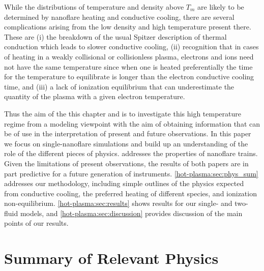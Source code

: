 While the distributions of temperature and density above $T_m$ are likely to be determined by nanoflare heating and conductive cooling, there are several complications arising from the low density and high temperature present there. These are (i) the breakdown of the usual Spitzer description of thermal conduction which leads to slower conductive cooling, (ii) recognition that in cases of heating in a weakly collisional or collisionless plasma, electrons and ions need not have the same temperature since when one is heated preferentially the time for the temperature to equilibrate is longer than the electron conductive cooling time, and (iii) a lack of ionization equilibrium that can underestimate the quantity of the plasma with a given electron temperature.

Thus the aim of the this chapter and \citet[ hereafter]{barnes_inference_2016-1} is to investigate this high temperature regime from a modeling viewpoint with the aim of obtaining information that can be of use in the interpretation of present and future observations. In this paper we focus on single-nanoflare simulations and build up an understanding of the role of the different pieces of physics.  addresses the properties of nanoflare trains. Given the limitations of present observations, the results of both papers are in part predictive for a future generation of instruments. \autoref{hot-plasma:sec:phys_sum} addresses our methodology, including simple outlines of the physics expected from conductive cooling, the preferred heating of different species, and ionization non-equilibrium. \autoref{hot-plasma:sec:results} shows results for our single- and two-fluid models, and \autoref{hot-plasma:sec:discussion} provides discussion of the main points of our results.

\section{Summary of Relevant Physics}\label{hot-plasma:sec:phys_sum}

